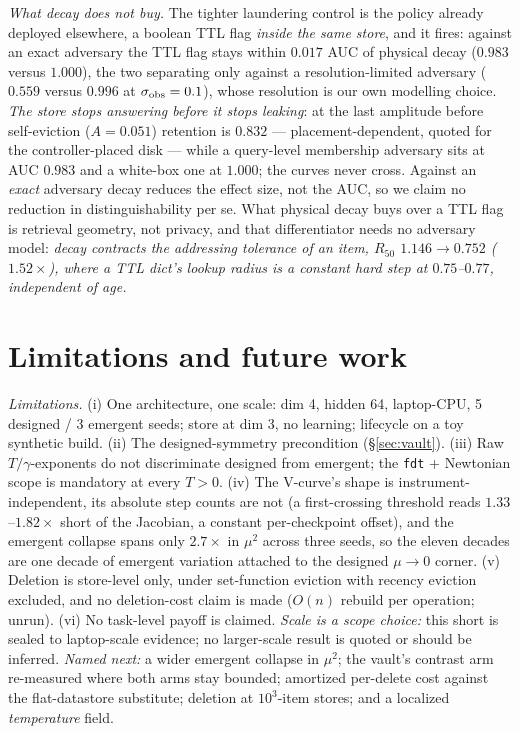 \documentclass{article}
\begin{document}
\emph{What decay does not buy.} The tighter laundering control is the policy already deployed elsewhere, a boolean TTL flag \emph{inside the same store}, and it fires: against an exact adversary the TTL flag stays within $0.017$ AUC of physical decay ($0.983$ versus $1.000$), the two separating only against a resolution-limited adversary ($0.559$ versus $0.996$ at $\sigma_{\rm obs}=0.1$), whose resolution is our own modelling choice. \emph{The store stops answering before it stops leaking}: at the last amplitude before self-eviction ($A=0.051$) retention is $0.832$ --- placement-dependent, quoted for the controller-placed disk --- while a query-level membership adversary sits at AUC $0.983$ and a white-box one at $1.000$; the curves never cross. Against an \emph{exact} adversary decay reduces the effect size, not the AUC, so we claim no reduction in distinguishability per se. What physical decay buys over a TTL flag is retrieval geometry, not privacy, and that differentiator needs no adversary model: \emph{decay contracts the addressing tolerance of an item, $R_{50}$ $1.146\to0.752$ ($1.52\times$), where a TTL dict's lookup radius is a constant hard step at $0.75$--$0.77$, independent of age.}

\section{Limitations and future work}\label{sec:limits}

{\emph{Limitations.} (i) One architecture, one scale: dim 4, hidden 64, laptop-CPU, 5 designed / 3 emergent seeds; store at dim 3, no learning; lifecycle on a toy synthetic build. (ii) The designed-symmetry precondition (\S\ref{sec:vault}). (iii) Raw $T/\gamma$-exponents do not discriminate designed from emergent; the \texttt{fdt} + Newtonian scope is mandatory at every $T>0$. (iv) The V-curve's shape is instrument-independent, its absolute step counts are not (a first-crossing threshold reads $1.33$--$1.82\times$ short of the Jacobian, a constant per-checkpoint offset), and the emergent collapse spans only $2.7\times$ in $\mu^2$ across three seeds, so the eleven decades are one decade of emergent variation attached to the designed $\mu\to0$ corner. (v) Deletion is store-level only, under set-function eviction with recency eviction excluded, and no deletion-cost claim is made ($O(n)$ rebuild per operation; unrun). (vi) No task-level payoff is claimed. \emph{Scale is a scope choice:} this short is sealed to laptop-scale evidence; no larger-scale result is quoted or should be inferred. \emph{Named next:} a wider emergent collapse in $\mu^2$; the vault's contrast arm re-measured where both arms stay bounded; amortized per-delete cost against the flat-datastore substitute; deletion at $10^3$-item stores; and a localized \emph{temperature} field.\par}
\clearpage
\appendix
\end{document}

